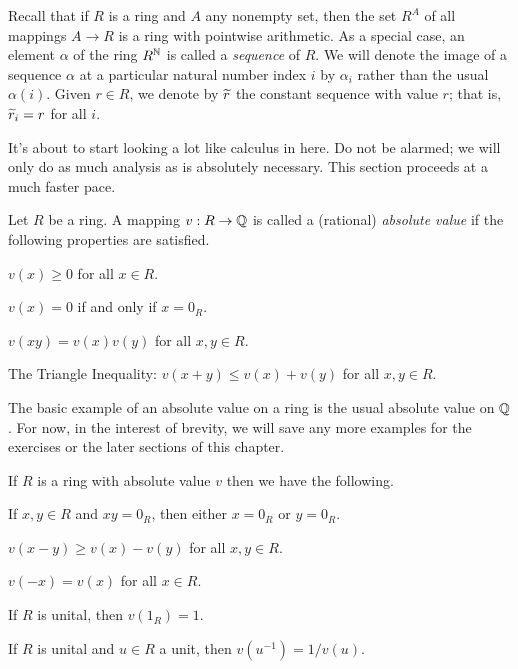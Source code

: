 Recall that if \(R\) is a ring and \(A\) any nonempty set, then the set \(R^A\) of all mappings \(A \rightarrow R\) is a ring with pointwise arithmetic.
As a special case, an element \(\alpha\) of the ring \(R^{\mathbb{N}}\) is called a \emph{sequence} of \(R\).
We will denote the image of a sequence \(\alpha\) at a particular natural number index \(i\) by \(\alpha_i\) rather than the usual \(\alpha(i)\).
Given \(r \in R\), we denote by \(\widetilde{r}\) the constant sequence with value \(r\); that is, \(\widetilde{r}_i = r\) for all \(i\).

It's about to start looking a lot like calculus in here.
Do not be alarmed; we will only do as much analysis as is absolutely necessary.
This section proceeds at a much faster pace.

\begin{dfn} \label{dfn:abs-val}
Let \(R\) be a ring.
A mapping \(v : R \rightarrow \mathbb{Q}\) is called a (rational) \emph{absolute value} if the following properties are satisfied.
\begin{proplist}
\item \(v(x) \geq 0\) for all \(x \in R\).
\item \(v(x) = 0\) if and only if \(x = 0_R\).
\item \(v(xy) = v(x)v(y)\) for all \(x,y \in R\).
\item The Triangle Inequality: \(v(x+y) \leq v(x) + v(y)\) for all \(x,y \in R\).
\end{proplist}
\end{dfn}

The basic example of an absolute value on a ring is the usual absolute value on \(\mathbb{Q}\).
For now, in the interest of brevity, we will save any more examples for the exercises or the later sections of this chapter.

\begin{prop} \label{prop:abs-val-basics}
If \(R\) is a ring with absolute value \(v\) then we have the following.
\begin{proplist}
\item If \(x,y \in R\) and \(xy = 0_R\), then either \(x = 0_R\) or \(y = 0_R\).
\item \label{prop:abs-val-basics:reverse-ti} \(v(x-y) \geq v(x) - v(y)\) for all \(x,y \in R\).
\item \(v(-x) = v(x)\) for all \(x \in R\).
\item If \(R\) is unital, then \(v(1_R) = 1\).
\item If \(R\) is unital and \(u \in R\) a unit, then \(v(u^{-1}) = 1/v(u)\).
\end{proplist}
\end{prop}

